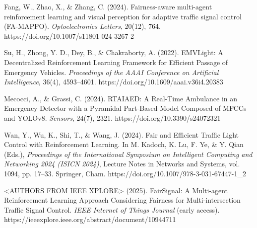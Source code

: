 
 Fang, W., Zhao, X., \& Zhang, C. (2024). Fairness-aware multi-agent reinforcement learning and visual perception for adaptive traffic signal control (FA-MAPPO). \textit{Optoelectronics Letters}, 20(12), 764. https://doi.org/10.1007/s11801-024-3267-2

 Su, H., Zhong, Y. D., Dey, B., \& Chakraborty, A. (2022). EMVLight: A Decentralized Reinforcement Learning Framework for Efficient Passage of Emergency Vehicles. \textit{Proceedings of the AAAI Conference on Artificial Intelligence}, 36(4), 4593--4601. https://doi.org/10.1609/aaai.v36i4.20383

 Mecocci, A., \& Grassi, C. (2024). RTAIAED: A Real-Time Ambulance in an Emergency Detector with a Pyramidal Part-Based Model Composed of MFCCs and YOLOv8. \textit{Sensors}, 24(7), 2321. https://doi.org/10.3390/s24072321

 Wan, Y., Wu, K., Shi, T., \& Wang, J. (2024). Fair and Efficient Traffic Light Control with Reinforcement Learning. In M. Kadoch, K. Lu, F. Ye, \& Y. Qian (Eds.), \textit{Proceedings of the International Symposium on Intelligent Computing and Networking 2024 (ISICN 2024)}, Lecture Notes in Networks and Systems, vol. 1094, pp. 17--33. Springer, Cham. https://doi.org/10.1007/978-3-031-67447-1\_2

 <AUTHORS FROM IEEE XPLORE> (2025). FairSignal: A Multi-agent Reinforcement Learning Approach Considering Fairness for Multi-intersection Traffic Signal Control. \textit{IEEE Internet of Things Journal} (early access). https://ieeexplore.ieee.org/abstract/document/10944711
